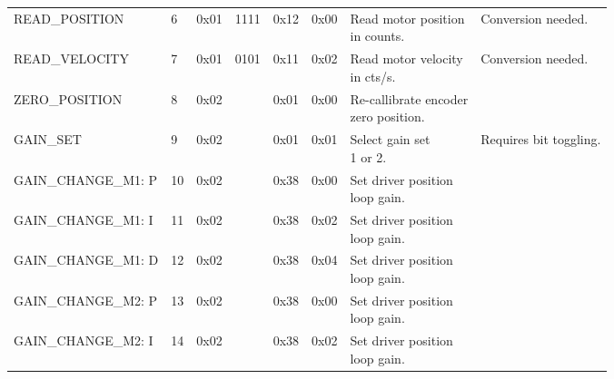 \begin{sidewaystable}[]
\begin{tabular}{llllllll}
READ\_POSITION     & 6                     & 0x01                  & 1111                             & 0x12                   & 0x00                    & \pbox{20cm}{Read motor position\\ in counts.}       & Conversion needed.     \\
READ\_VELOCITY     & 7                     & 0x01                  & 0101                             & 0x11                   & 0x02                    & \pbox{20cm}{Read motor velocity\\ in cts/s.}        & Conversion needed.     \\
ZERO\_POSITION     & 8                     & 0x02                  &                                  & 0x01                   & 0x00                    & \pbox{20cm}{Re-callibrate encoder\\ zero position.} &                        \\
GAIN\_SET          & 9                     & 0x02                  &                                  & 0x01                   & 0x01                    & \pbox{20cm}{Select gain set\\ 1 or 2.}              & Requires bit toggling. \\
GAIN\_CHANGE\_M1: P & 10                    & 0x02                  &                                  & 0x38                   & 0x00                    & \pbox{20cm}{Set driver position\\ loop gain.}       &                        \\
GAIN\_CHANGE\_M1: I & 11                    & 0x02                  &                                  & 0x38                   & 0x02                    & \pbox{20cm}{Set driver position\\ loop gain.}       &                        \\
GAIN\_CHANGE\_M1: D & 12                    & 0x02                  &                                  & 0x38                   & 0x04                    & \pbox{20cm}{Set driver position\\ loop gain.}       &                        \\
GAIN\_CHANGE\_M2: P & 13                    & 0x02                  &                                  & 0x38                   & 0x00                    & \pbox{20cm}{Set driver position\\ loop gain.}       &                        \\
GAIN\_CHANGE\_M2: I & 14                    & 0x02                  &                                  & 0x38                   & 0x02                    & \pbox{20cm}{Set driver position\\ loop gain.}       &                        \\

\end{tabular}
\end{sidewaystable}
